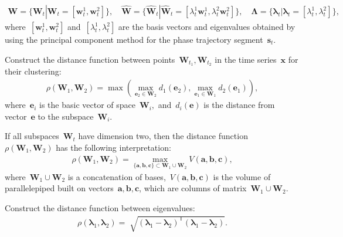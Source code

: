 \documentclass[12pt, twoside]{article}
\numberwithin{equation}{section}
\begin{document}
\begin{equation}
\label{eq:cl:3}
\begin{aligned}
\mathbf{W} = \{\textbf{W}_t| \textbf{W}_t = [\textbf{w}^1_t, \textbf{w}^2_t]\}, \quad \hat{\mathbf{W}} = \{\hat{\textbf{W}}_t| \hat{\textbf{W}}_t = [\lambda^1_t\textbf{w}^1_t, \lambda^2_t\textbf{w}^2_t]\}, \quad \bm{\Lambda} = \{\bm{\lambda}_t| \bm{\lambda}_t=[\lambda^1_t, \lambda^2_t]\},
\end{aligned}
\end{equation}
where~$[\textbf{w}^1_t, \textbf{w}^2_t]$ and~$[\lambda^1_t, \lambda^2_t]$ are the basis vectors and eigenvalues obtained by using the principal component method for the phase trajectory segment~$\textbf{s}_t$.



Construct the distance function between points~$\mathbf{W}_{t_1},\mathbf{W}_{t_2}$ in the time series~$\textbf{x}$ for their clustering:
\begin{equation}
\label{eq:cl:4}
\begin{aligned}
\rho\left(\textbf{W}_1, \textbf{W}_2\right) = \max\left(\max_{\textbf{e}_2 \in \textbf{W}_2} d_{1}\left(\textbf{e}_2\right), \max_{\textbf{e}_1 \in \textbf{W}_1} d_{2}\left(\textbf{e}_1\right)\right),
\end{aligned}
\end{equation}
where~$\textbf{e}_i$ is the basic vector of space~$\textbf{W}_i,$ and~$d_i\left(\textbf{e}\right)$ is the distance from vector~$\textbf{e}$ to the subspace~$\textbf{W}_i$.

If all subspaces~$\textbf{W}_t$ have dimension two, then the distance function~$\rho\left(\textbf{W}_1, \textbf{W}_2\right)$ has the following interpretation:
\begin{equation}
\label{eq:cl:5}
\begin{aligned}
\rho\left(\textbf{W}_1, \textbf{W}_2\right) = \max_{\{\textbf{a},\textbf{b},\textbf{c}\} \subset \textbf{W}_1\cup \textbf{W}_2 } V\left(\textbf{a},\textbf{b},\textbf{c}\right), 
\end{aligned}
\end{equation}
where~$\textbf{W}_1\cup\textbf{W}_2$ is a concatenation of bases,~$V\left(\textbf{a},\textbf{b},\textbf{c}\right)$ is the volume of parallelepiped built on vectors~$\textbf{a}, \textbf{b}, \textbf{c}$, which are columns of matrix~$\textbf{W}_1\cup\textbf{W}_2$.

Construct the distance function between eigenvalues:
\begin{equation}
\label{eq:cl:6}
\begin{aligned}
\rho\left(\bm{\lambda}_1, \bm{\lambda}_2\right) = \sqrt[]{\left(\bm{\lambda}_1 - \bm{\lambda}_2\right)^{\mathsf{T}}\left(\bm{\lambda}_1 - \bm{\lambda}_2\right)}.
\end{aligned}
\end{equation}
\end{document}
